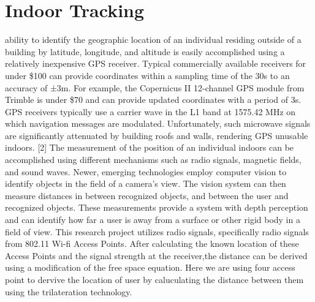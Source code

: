\documentclass[conference]{IEEEtran}
\begin{document}
\section{Indoor Tracking}
\noindentThe ability to identify the geographic location of an individual residing outside of a building by latitude, longitude, and altitude is easily accomplished using a relatively inexpensive GPS receiver. Typical commercially available receivers for under \$100 can provide coordinates within a sampling time of the 30s to an accuracy of ±3m. For example, the Copernicus II 12-channel GPS module from Trimble is under \$70 and can provide updated coordinates with a period of 3s. GPS receivers typically use a carrier wave in the L1 band at 1575.42 MHz on which navigation messages are modulated. Unfortunately, such microwave signals are significantly attenuated by building roofs and walls, rendering GPS unusable indoors. [2]
The measurement of  the position of an individual indoors can be accomplished using different mechanisms such as radio signals, magnetic fields, and sound waves. Newer, emerging technologies employ computer vision to identify objects in the field of a camera's view. The vision system can then measure distances in between recognized objects, and between the user and recognized objects. These measurements provide a system with depth perception and can identify how far a user is away from a surface or other rigid body in a field of view.
This research project utilizes radio signals, specifically radio signals from 802.11 Wi-fi Access Points. After calculating the known location of these Access Points and the signal strength at the receiver,the distance can be derived using a modification of the free space equation. Here we are using four access point to dervive the location of user by caluculating the distance between them using the trilateration technology.
\end{document}
